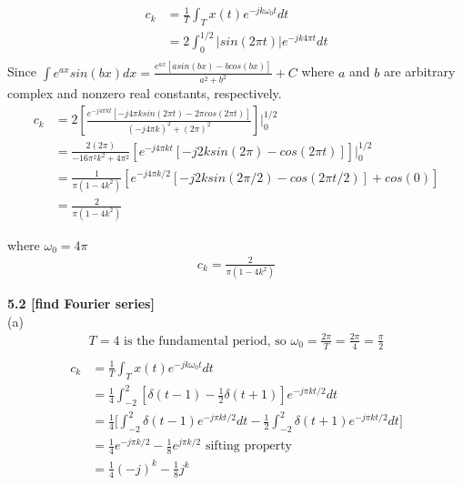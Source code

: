 \documentclass{article}
\begin{document}
\begin{equation*}
\begin{split}
    c_k &= \frac{1}{T} \int_T x(t)e^{-jk\omega_0t}dt\\
    &= 2 \int_0^{1/2} |sin(2\pi t)|e^ {-jk4\pi t}dt\\
\end{split}
\end{equation*}
Since $\int e^{ax}sin(bx)dx = \frac{e^{ax}[asin(bx) - bcos(bx)]}{a^2 + b^2} + C$ where $a$ and $b$ are arbitrary complex and nonzero real constants, respectively.
\begin{equation*}
\begin{split}
    c_k &= 2[\frac{e^{-j4 \pi k t}[-j4 \pi ksin(2\pi t) - 2\pi cos(2 \pi t)]}{(-j4 \pi k)^2 + (2 \pi)^2}]\big|_0^{1/2}\\
    &= \frac{2(2 \pi)}{-16\pi^2 k^2 + 4\pi^2}[e^{-j4\pi kt} [-j2ksin(2 \pi) - cos(2\pi t)]]\big|_0^{1/2}\\
    &= \frac{1}{\pi(1-4k^2)}[e^{-j4\pi k/2} [-j2ksin(2 \pi / 2) - cos(2\pi t / 2)] + cos(0)]\\
    &= \frac{2}{\pi(1-4k^2)}
\end{split}
\end{equation*}


where $\omega_0 = 4\pi$
\begin{equation*}
\begin{split}
    c_k = \frac{2}{\pi(1 - 4k^2)}
\end{split}
\end{equation*}


\bigskip
{\bf 5.2 [find Fourier series]}\\
(a)\\
\begin{equation*}
\begin{split}
    T = 4 \text{ is the fundamental period, so } \omega_0 = \frac{2\pi}{T} = \frac{2\pi}{4} = \frac{\pi}{2}\\
\end{split}
\end{equation*}
\begin{equation*}
\begin{split}
    c_k &= \frac{1}{T} \int_T x(t)e^{-jk\omega_0t}dt\\
    &= \frac{1}{4} \int_{-2}^{2}[\delta(t - 1) - \frac{1}{2}\delta(t + 1)]e^{-j\pi kt/2}dt\\
    &= \frac{1}{4} \Big[\int_{-2}^{2}\delta(t - 1)e^{-j\pi kt/2}dt - \frac{1}{2}\int_{-2}^{2}\delta(t + 1)e^{-j\pi kt/2}dt\Big] \\
    &= \frac{1}{4}e^{-j \pi k/2} - \frac{1}{8}e^{j\pi k/2} \text{ sifting property}\\
    &= \frac{1}{4}(-j)^k - \frac{1}{8}j^k
\end{split}
\end{equation*}
\end{document}
